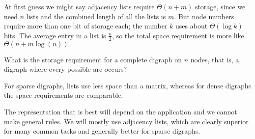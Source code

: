 At first guess we might say adjacency lists require $\Theta(n + m)$ storage, 
since we need $n$ lists and the combined length of all the lists is $m$.
But node numbers require more than one bit of storage each; the number $k$ uses about $\Theta(\log k)$ bits.
The average entry in a list is $\frac n 2$, so the total space requirement is more like $\Theta(n + m \log(n))$ 

\begin{Boxample}[5]
What is the storage requirement for a complete digraph on $n$ nodes, that is, a digraph where every possible arc
occurs?
\end{Boxample}

For sparse digraphs, lists use less space than a matrix, whereas for 
dense digraphs the space requirements are comparable.
%

The representation that is best will depend on the application and we cannot make general rules.  
We will mostly use adjacency lists, which are
clearly superior for many common tasks and generally better for sparse digraphs.

